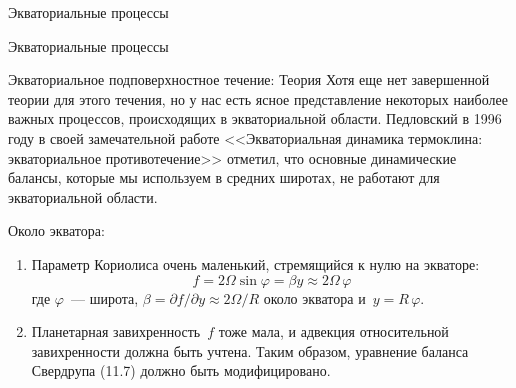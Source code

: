 \begin{chapter}{Экваториальные процессы}
\begin{section}{Экваториальные процессы}
\begin{paragraph}{Экваториальное подповерхностное течение: Теория}
Хотя еще нет завершенной теории для этого течения, но у нас есть ясное
представление некоторых наиболее важных процессов, происходящих в
экваториальной области. Педловский в 1996 году в своей замечательной
работе <<Экваториальная динамика термоклина: экваториальное
противотечение>> отметил, что основные динамические балансы, которые мы
используем в средних широтах, не работают для экваториальной области.
%

Около экватора:
\begin{enumerate}
\item
Параметр Кориолиса очень маленький, стремящийся к нулю на экваторе:
\begin{equation}
 f=2\Omega \sin\varphi = \beta y \approx 2\Omega \,\varphi
\end{equation}
где $\varphi$~--- широта, $\beta = \partial f/\partial y \approx 2\Omega/R$ 
около экватора и~$y=R\,\varphi$.
%

\item
Планетарная завихренность~$f$ тоже мала, и адвекция относительной
завихренности должна быть учтена. Таким образом, уравнение баланса
Свердрупа (11.7) должно быть модифицировано.
%


\end{enumerate}
\end{paragraph}
\end{section}
\end{chapter}
